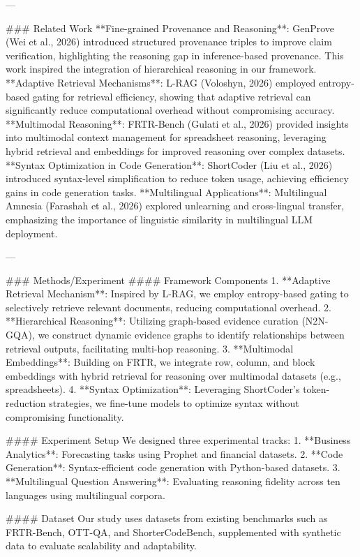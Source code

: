 ---

### Related Work  
**Fine-grained Provenance and Reasoning**: GenProve (Wei et al., 2026) introduced structured provenance triples to improve claim verification, highlighting the reasoning gap in inference-based provenance. This work inspired the integration of hierarchical reasoning in our framework.  
**Adaptive Retrieval Mechanisms**: L-RAG (Voloshyn, 2026) employed entropy-based gating for retrieval efficiency, showing that adaptive retrieval can significantly reduce computational overhead without compromising accuracy.  
**Multimodal Reasoning**: FRTR-Bench (Gulati et al., 2026) provided insights into multimodal context management for spreadsheet reasoning, leveraging hybrid retrieval and embeddings for improved reasoning over complex datasets.  
**Syntax Optimization in Code Generation**: ShortCoder (Liu et al., 2026) introduced syntax-level simplification to reduce token usage, achieving efficiency gains in code generation tasks.  
**Multilingual Applications**: Multilingual Amnesia (Farashah et al., 2026) explored unlearning and cross-lingual transfer, emphasizing the importance of linguistic similarity in multilingual LLM deployment.

---

### Methods/Experiment  
#### Framework Components  
1. **Adaptive Retrieval Mechanism**: Inspired by L-RAG, we employ entropy-based gating to selectively retrieve relevant documents, reducing computational overhead.  
2. **Hierarchical Reasoning**: Utilizing graph-based evidence curation (N2N-GQA), we construct dynamic evidence graphs to identify relationships between retrieval outputs, facilitating multi-hop reasoning.  
3. **Multimodal Embeddings**: Building on FRTR, we integrate row, column, and block embeddings with hybrid retrieval for reasoning over multimodal datasets (e.g., spreadsheets).  
4. **Syntax Optimization**: Leveraging ShortCoder's token-reduction strategies, we fine-tune models to optimize syntax without compromising functionality.  

#### Experiment Setup  
We designed three experimental tracks:  
1. **Business Analytics**: Forecasting tasks using Prophet and financial datasets.  
2. **Code Generation**: Syntax-efficient code generation with Python-based datasets.  
3. **Multilingual Question Answering**: Evaluating reasoning fidelity across ten languages using multilingual corpora.

#### Dataset  
Our study uses datasets from existing benchmarks such as FRTR-Bench, OTT-QA, and ShorterCodeBench, supplemented with synthetic data to evaluate scalability and adaptability.

